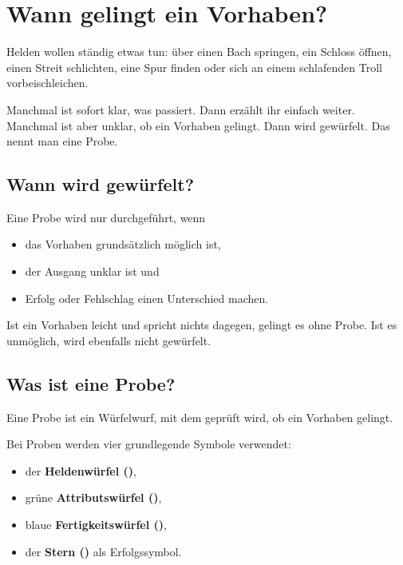 \chapter{Wann gelingt ein Vorhaben?}
\label{chap:checks}

Helden wollen ständig etwas tun: über einen Bach springen, ein Schloss öffnen, einen Streit schlichten, eine Spur finden oder sich an einem schlafenden Troll vorbeischleichen.

Manchmal ist sofort klar, was passiert. Dann erzählt ihr einfach weiter. Manchmal ist aber unklar, ob ein Vorhaben gelingt. Dann wird gewürfelt. Das nennt man eine Probe.

\section{Wann wird gewürfelt?}

\begin{kurzregel}[title=Wann ist eine Probe nötig?]
Eine Probe wird nur durchgeführt, wenn
\begin{itemize}
  \item das Vorhaben grundsätzlich möglich ist,
  \item der Ausgang unklar ist und
  \item Erfolg oder Fehlschlag einen Unterschied machen.
\end{itemize}
\end{kurzregel}

Ist ein Vorhaben leicht und spricht nichts dagegen, gelingt es ohne Probe. Ist es unmöglich, wird ebenfalls nicht gewürfelt.

\section{Was ist eine Probe?}

Eine Probe ist ein Würfelwurf, mit dem geprüft wird, ob ein Vorhaben gelingt.

Bei Proben werden vier grundlegende Symbole verwendet:

\begin{itemize}
  \item der \textbf{Heldenwürfel (\heroDie)},
  \item grüne \textbf{Attributswürfel (\greenDie)},
  \item blaue \textbf{Fertigkeitswürfel (\blueDie)},
  \item der \textbf{Stern (\star)} als Erfolgssymbol.
\end{itemize}

